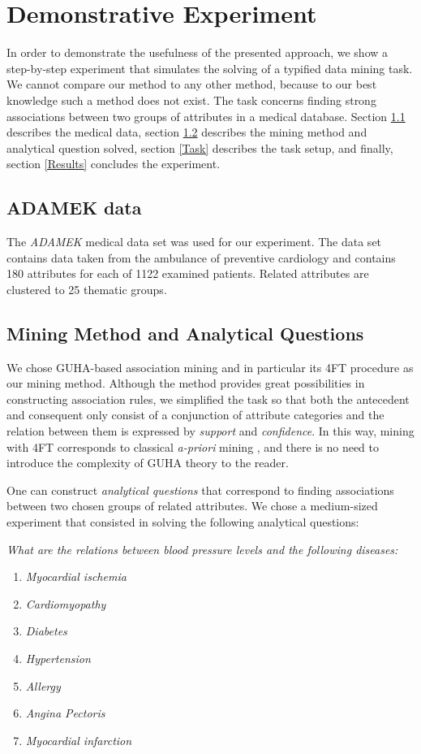 \section{Demonstrative Experiment} \label{Experiments}

In order to demonstrate the usefulness of the presented approach, we show a step-by-step experiment that simulates the solving of a typified data mining task. We cannot compare our method to any other method, because to our best knowledge such a method does not exist. 
The task concerns finding strong associations between two groups of attributes in a medical database. 
Section \ref{Adamek} describes the medical data, section \ref{Method} describes the mining method and analytical question solved, section \ref{Task} describes the task setup, and finally, section \ref{Results} concludes the experiment.

\subsection{ADAMEK data}\label{Adamek}
The \emph{ADAMEK} medical data set \cite{Adamek} was used for our experiment. 
The data set contains data taken from the ambulance of preventive cardiology and contains 180 attributes for each of 1122 examined patients. 
Related attributes are clustered to 25 thematic groups. 

\subsection{Mining Method and Analytical Questions}\label{Method}
We chose GUHA-based association mining and in particular its 4FT procedure as our mining method. 
Although the method provides great possibilities in constructing association rules, we simplified the task so that both the antecedent and consequent only consist of a conjunction of attribute categories and the relation between them is expressed by \emph{support} and \emph{confidence}. 
In this way, mining with 4FT corresponds to classical \emph{a-priori} mining \cite{Agrawal}, and there is no need to introduce the complexity of GUHA theory to the reader. 

One can construct \emph{analytical questions} that correspond to finding associations between two chosen groups of related attributes. We chose a medium-sized experiment that consisted in solving the following analytical questions:

\medskip
\noindent
\emph{What are the relations between blood pressure levels and the following diseases:}
	\begin{enumerate}
		\item \emph{Myocardial ischemia}
		\item \emph{Cardiomyopathy}
		\item \emph{Diabetes}
		\item \emph{Hypertension}
		\item \emph{Allergy}
		\item \emph{Angina Pectoris}
		\item \emph{Myocardial infarction}
	\end{enumerate}

